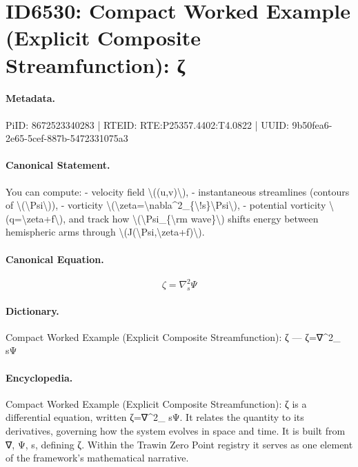 \section*{ID6530: Compact Worked Example (Explicit Composite Streamfunction): ζ}
\paragraph{Metadata.}
PiID: 8672523340283 | RTEID: RTE:P25357.4402:T4.0822 | UUID: 9b50fea6-2e65-5cef-887b-5472331075a3

\paragraph{Canonical Statement.}
You can compute: - velocity field \textbackslash{}((u,v)\textbackslash{}), - instantaneous streamlines (contours of \textbackslash{}(\textbackslash{}Psi\textbackslash{})), - vorticity \textbackslash{}(\textbackslash{}zeta=\textbackslash{}nabla\textasciicircum{}2\_\{\textbackslash{}!s\}\textbackslash{}Psi\textbackslash{}), - potential vorticity \textbackslash{}(q=\textbackslash{}zeta+f\textbackslash{}), and track how \textbackslash{}(\textbackslash{}Psi\_\{\textbackslash{}rm wave\}\textbackslash{}) shifts energy between hemispheric arms through \textbackslash{}(J(\textbackslash{}Psi,\textbackslash{}zeta+f)\textbackslash{}).

\paragraph{Canonical Equation.}
\[
\zeta=\nabla^2_{\!s}\Psi
\]

\paragraph{Dictionary.}
Compact Worked Example (Explicit Composite Streamfunction): ζ — ζ=∇\textasciicircum{}2\_ sΨ

\paragraph{Encyclopedia.}
Compact Worked Example (Explicit Composite Streamfunction): ζ is a differential equation, written ζ=∇\textasciicircum{}2\_ sΨ. It relates the quantity to its derivatives, governing how the system evolves in space and time. It is built from ∇, Ψ, s, defining ζ. Within the Trawin Zero Point registry it serves as one element of the framework's mathematical narrative.
